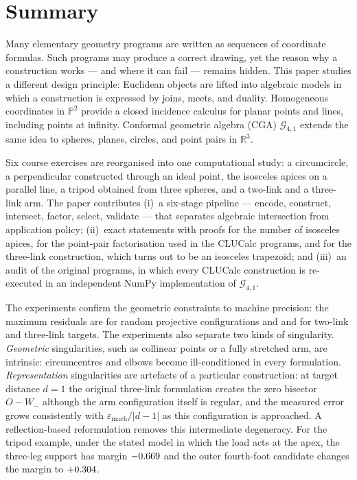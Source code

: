 \documentclass[11pt,a4paper]{article}
\theoremstyle{plain}
\theoremstyle{definition}
\theoremstyle{remark}
\newcommand{\R}{\mathbb{R}}
\newcommand{\PP}{\mathbb{P}}
\newcommand{\GA}{\mathcal{G}_{4,1}}
\newcommand{\abs}[1]{\left\lvert#1\right\rvert}
\begin{document}
\clearpage
\section*{Summary}

Many elementary geometry programs are written as sequences of coordinate
formulas. Such programs may produce a correct drawing, yet the reason why a
construction works --- and where it can fail --- remains hidden. This paper
studies a different design principle: Euclidean objects are lifted into
algebraic models in which a construction is expressed by joins, meets, and
duality. Homogeneous coordinates in $\PP^2$ provide a closed incidence calculus
for planar points and lines, including points at infinity. Conformal geometric
algebra (CGA) $\GA$ extends the same idea to spheres, planes, circles, and
point pairs in $\R^3$.

Six course exercises are reorganised into one computational study: a
circumcircle, a perpendicular constructed through an ideal point, the
isosceles apices on a parallel line, a tripod obtained from three spheres, and
a two-link and a three-link arm. The paper contributes
(i)~a six-stage pipeline --- encode, construct, intersect, factor, select,
validate --- that separates algebraic intersection from application policy;
(ii)~exact statements with proofs for the number of isosceles apices, for the
point-pair factorisation used in the CLUCalc programs, and for the three-link
construction, which turns out to be an isosceles trapezoid; and
(iii)~an audit of the original programs, in which every CLUCalc construction is
re-executed in an independent NumPy implementation of $\GA$.

The experiments confirm the geometric constraints to machine precision: the
maximum residuals are \ProjectiveMaximum{} for \ProjectiveTrials{} random
projective configurations and \TwoLinkMaximum{} and \ThreeLinkMaximum{} for
\TwoLinkTrials{} two-link and \ThreeLinkTrials{} three-link targets. The
experiments also separate two kinds of singularity. \emph{Geometric}
singularities, such as collinear points or a fully stretched arm, are
intrinsic: circumcentres and elbows become ill-conditioned in every
formulation. \emph{Representation} singularities are artefacts of a particular
construction: at target distance $d=1$ the original three-link formulation
creates the zero bisector $O-W_-$ although the arm configuration itself is
regular, and the measured error grows consistently with
$\varepsilon_{\mathrm{mach}}/\abs{d-1}$ as this configuration is approached.
A reflection-based reformulation removes this intermediate degeneracy. For the
tripod example, under the stated model in which the load acts at the apex, the
three-leg support has margin $-0.669$ and the outer fourth-foot
candidate changes the margin to $+0.304$.
\end{document}

